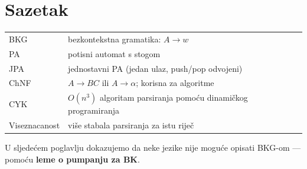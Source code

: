 \section*{Sazetak}

\medskip\noindent
\begin{tabular}{ll}
  BKG & bezkontekstna gramatika: $A \to w$ \\
  PA & potisni automat s stogom \\
  JPA & jednostavni PA (jedan ulaz, push/pop odvojeni) \\
  ChNF & $A \to BC$ ili $A \to \alpha$; korisna za algoritme \\
  CYK & $O(n^3)$ algoritam parsiranja pomoću dinamičkog programiranja \\
  Viseznacanost & više stabala parsiranja za istu riječ \\
\end{tabular}

\medskip\noindent
U sljedećem poglavlju dokazujemo da neke jezike nije moguće opisati BKG-om
--- pomoću \textbf{leme o pumpanju za BK}.

